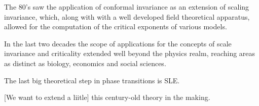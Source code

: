 The 80's saw the application of conformal invariance as an extension of scaling
invariance, which, along with with a well developed field theoretical
apparatus, allowed for the computation of the critical exponents of various
models.

In the last two decades the scope of applications for the concepts of scale
invariance and criticality extended well beyond the physics realm, reaching
areas as distinct as biology, economics and social sciences.

The last big theoretical step in phase transitions is SLE\@.

[We want to extend a liitle]  this century-old theory in the making.
